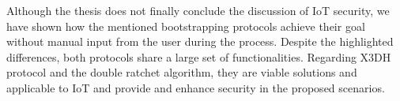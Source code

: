 Although the thesis does not finally conclude the discussion of IoT security, we have shown how the mentioned bootstrapping protocols achieve their goal without manual input from the user during the process. Despite the highlighted differences, both protocols share a large set of functionalities.
Regarding X3DH protocol and the double ratchet algorithm, they are viable solutions and applicable to IoT and provide and enhance security in the proposed scenarios.